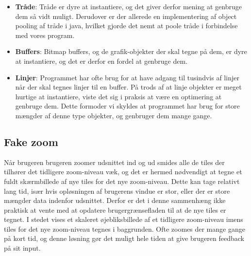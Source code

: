 \begin{itemize}
	\item \textbf{Tråde}: Tråde er dyre at instantiere, og det giver derfor mening at genbruge dem så vidt muligt. Derudover er der allerede en implementering af object pooling af tråde i java, hvilket gjorde det nemt at poole tråde i forbindelse med vores program.
	\item \textbf{Buffers}: Bitmap buffers, og de grafik-objekter der skal tegne på dem, er dyre at instantiere, og det er derfor en fordel at genbruge dem.
	\item \textbf{Linjer}: Programmet har ofte brug for at have adgang til tusindvis af linjer når der skal tegnes linjer til en buffer. På trods af at linje objekter er meget hurtige at instantiere, viste det sig i praksis at være en optimering at genbruge dem. Dette formoder vi skyldes at programmet har brug for store mængder af denne type objekter, og genbruger dem mange gange.
\end{itemize}

\subsection{Fake zoom}
\label{subsec:fakeZoom}

Når brugeren brugeren zoomer udsnittet ind og ud smides alle de tiles der tilhører det tidligere zoom-niveau væk, og det er hermed nødvendigt at tegne et fuldt skærmbillede af nye tiles for det nye zoom-niveau. Dette kan tage relativt lang tid, især hvis opløsningen af brugerens vindue er stor, eller der er store mængder data indenfor udsnittet. Derfor er det i denne sammenhæng ikke praktisk at vente med at opdatere brugergrænsefladen til at de nye tiles er tegnet. I stedet vises et skaleret øjebliksbillede af et tidligere zoom-niveau imens tiles for det nye zoom-niveau tegnes i baggrunden. Ofte zoomes der mange gange på kort tid, og denne løsning gør det muligt hele tiden at give brugeren feedback på sit input.